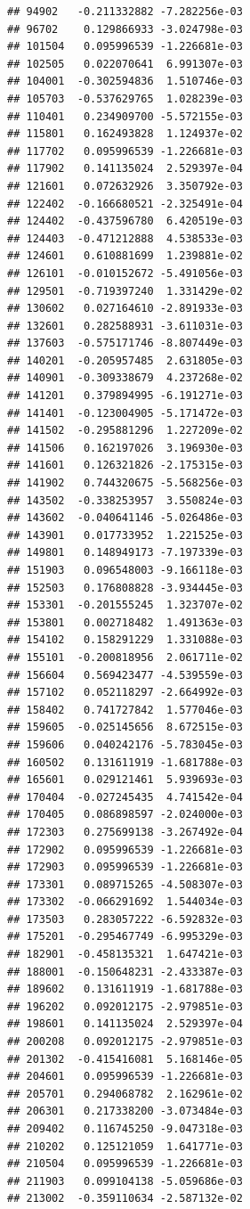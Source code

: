 \documentclass[ignorenonframetext,]{beamer}
\begin{document}
\begin{frame}[fragile]
\begin{verbatim}
## 94902   -0.211332882 -7.282256e-03
## 96702    0.129866933 -3.024798e-03
## 101504   0.095996539 -1.226681e-03
## 102505   0.022070641  6.991307e-03
## 104001  -0.302594836  1.510746e-03
## 105703  -0.537629765  1.028239e-03
## 110401   0.234909700 -5.572155e-03
## 115801   0.162493828  1.124937e-02
## 117702   0.095996539 -1.226681e-03
## 117902   0.141135024  2.529397e-04
## 121601   0.072632926  3.350792e-03
## 122402  -0.166680521 -2.325491e-04
## 124402  -0.437596780  6.420519e-03
## 124403  -0.471212888  4.538533e-03
## 124601   0.610881699  1.239881e-02
## 126101  -0.010152672 -5.491056e-03
## 129501  -0.719397240  1.331429e-02
## 130602   0.027164610 -2.891933e-03
## 132601   0.282588931 -3.611031e-03
## 137603  -0.575171746 -8.807449e-03
## 140201  -0.205957485  2.631805e-03
## 140901  -0.309338679  4.237268e-02
## 141201   0.379894995 -6.191271e-03
## 141401  -0.123004905 -5.171472e-03
## 141502  -0.295881296  1.227209e-02
## 141506   0.162197026  3.196930e-03
## 141601   0.126321826 -2.175315e-03
## 141902   0.744320675 -5.568256e-03
## 143502  -0.338253957  3.550824e-03
## 143602  -0.040641146 -5.026486e-03
## 143901   0.017733952  1.221525e-03
## 149801   0.148949173 -7.197339e-03
## 151903   0.096548003 -9.166118e-03
## 152503   0.176808828 -3.934445e-03
## 153301  -0.201555245  1.323707e-02
## 153801   0.002718482  1.491363e-03
## 154102   0.158291229  1.331088e-03
## 155101  -0.200818956  2.061711e-02
## 156604   0.569423477 -4.539559e-03
## 157102   0.052118297 -2.664992e-03
## 158402   0.741727842  1.577046e-03
## 159605  -0.025145656  8.672515e-03
## 159606   0.040242176 -5.783045e-03
## 160502   0.131611919 -1.681788e-03
## 165601   0.029121461  5.939693e-03
## 170404  -0.027245435  4.741542e-04
## 170405   0.086898597 -2.024000e-03
## 172303   0.275699138 -3.267492e-04
## 172902   0.095996539 -1.226681e-03
## 172903   0.095996539 -1.226681e-03
## 173301   0.089715265 -4.508307e-03
## 173302  -0.066291692  1.544034e-03
## 173503   0.283057222 -6.592832e-03
## 175201  -0.295467749 -6.995329e-03
## 182901  -0.458135321  1.647421e-03
## 188001  -0.150648231 -2.433387e-03
## 189602   0.131611919 -1.681788e-03
## 196202   0.092012175 -2.979851e-03
## 198601   0.141135024  2.529397e-04
## 200208   0.092012175 -2.979851e-03
## 201302  -0.415416081  5.168146e-05
## 204601   0.095996539 -1.226681e-03
## 205701   0.294068782  2.162961e-02
## 206301   0.217338200 -3.073484e-03
## 209402   0.116745250 -9.047318e-03
## 210202   0.125121059  1.641771e-03
## 210504   0.095996539 -1.226681e-03
## 211903   0.099104138 -5.059686e-03
## 213002  -0.359110634 -2.587132e-02

\end{verbatim}
\end{frame}
\end{document}
